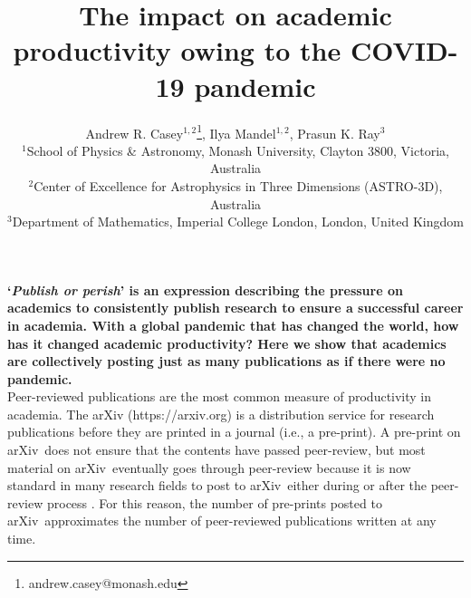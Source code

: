 \documentclass[a4paper,12pt]{article}
\title{The impact on academic productivity owing to the COVID-19 pandemic}
\author{Andrew R. Casey$^{1,2}$\footnote{andrew.casey@monash.edu},
        Ilya Mandel$^{1,2}$,
        Prasun K. Ray$^{3}$\\
\normalsize{$^{1}$School of Physics \& Astronomy, Monash University, Clayton 3800, Victoria, Australia}\\
\normalsize{$^{2}$Center of Excellence for Astrophysics in Three Dimensions (ASTRO-3D), Australia}\\
\normalsize{$^{3}$Department of Mathematics, Imperial College London, London, United Kingdom}
}
\date{}
\newcommand{\todo}[1]{\textcolor{red}{#1}}
\newcommand{\arxiv}{arXiv}
\begin{document}
\newpage
\setcounter{page}{1}
\resetlinenumber[1]

\maketitle




\noindent \textbf{`\emph{Publish or perish}' is an expression describing the pressure on academics to consistently publish research to ensure a successful career in academia. With a global pandemic that has changed the world, how has it changed academic productivity? Here we show that academics are collectively posting just as many publications as if there were no pandemic.
}\\



\noindent Peer-reviewed publications are the most common measure of productivity in academia. The \arxiv\cite{Ginsparg:2011} ({https://arxiv.org}) is a distribution service for research publications before they are printed in a journal (i.e., a pre-print). A pre-print on \arxiv\ does not ensure that the contents have passed peer-review, but most material on \arxiv\ eventually goes through peer-review because it is now standard in many research fields to post to \arxiv\ either during or after the peer-review process \cite{Lariviere:2014}. For this reason, the number of pre-prints posted to \arxiv\ approximates the number of peer-reviewed publications written at any time.
\end{document}
